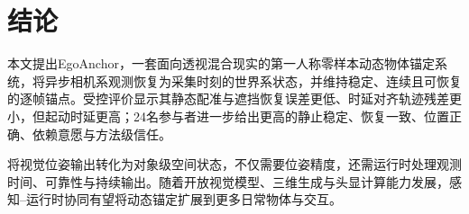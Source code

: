 \documentclass[review]{vgtc}
\begin{document}
\section{结论}\label{sec:conclusion}

本文提出EgoAnchor，一套面向透视混合现实的第一人称零样本动态物体锚定系统，将异步相机系观测恢复为采集时刻的世界系状态，并维持稳定、连续且可恢复的逐帧锚点。受控评价显示其静态配准与遮挡恢复误差更低、时延对齐轨迹残差更小，但起动时延更高；24名参与者进一步给出更高的静止稳定、恢复一致、位置正确、依赖意愿与方法级信任。

将视觉位姿输出转化为对象级空间状态，不仅需要位姿精度，还需运行时处理观测时间、可靠性与持续输出。随着开放视觉模型、三维生成与头显计算能力发展，感知--运行时协同有望将动态锚定扩展到更多日常物体与交互。




\end{document}
